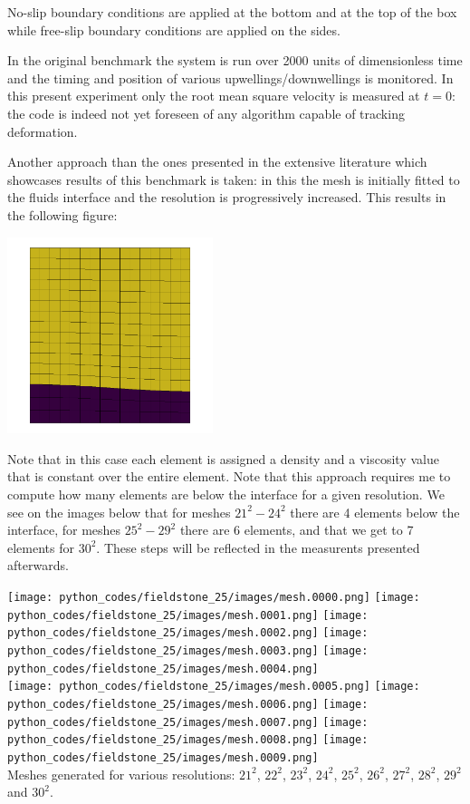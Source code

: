 No-slip boundary conditions are applied at the bottom and at the top of the box 
while free-slip boundary conditions are applied on the sides. 

In the original benchmark the system is run over 2000 units of dimensionless time and the 
timing and position of various upwellings/downwellings is monitored. 
In this present experiment only the root mean square velocity is measured at $t=0$:
the code is indeed not yet foreseen of any algorithm capable of tracking deformation.

Another approach than the ones presented in the extensive literature which showcases 
results of this benchmark is taken: in this \stone the mesh is initially fitted to the fluids
interface and the resolution is progressively increased. This results in the 
following figure:

\begin{center}
\includegraphics[width=6cm]{python_codes/fieldstone_25/newresults/mats}
\end{center}
Note that in this case each element is assigned a density and a viscosity value that 
is constant over the entire element. 
Note that this approach requires me to compute how many elements are below the interface
for a given resolution. We see on the images below that for meshes $21^2-24^2$ there 
are 4 elements below the interface, for meshes $25^2-29^2$ there are 6 elements, and that 
we get to 7 elements for $30^2$. These steps will be reflected in the measurents presented 
afterwards.

\begin{center}
\texttt{[image: python\_codes/fieldstone\_25/images/mesh.0000.png]}
\texttt{[image: python\_codes/fieldstone\_25/images/mesh.0001.png]}
\texttt{[image: python\_codes/fieldstone\_25/images/mesh.0002.png]}
\texttt{[image: python\_codes/fieldstone\_25/images/mesh.0003.png]}
\texttt{[image: python\_codes/fieldstone\_25/images/mesh.0004.png]}\\
\texttt{[image: python\_codes/fieldstone\_25/images/mesh.0005.png]}
\texttt{[image: python\_codes/fieldstone\_25/images/mesh.0006.png]}
\texttt{[image: python\_codes/fieldstone\_25/images/mesh.0007.png]}
\texttt{[image: python\_codes/fieldstone\_25/images/mesh.0008.png]}
\texttt{[image: python\_codes/fieldstone\_25/images/mesh.0009.png]}\\
{\captionfont Meshes generated for various resolutions: $21^2$, $22^2$, $23^2$, 
$24^2$, $25^2$, $26^2$, $27^2$, $28^2$, $29^2$ and $30^2$.}
\end{center}

